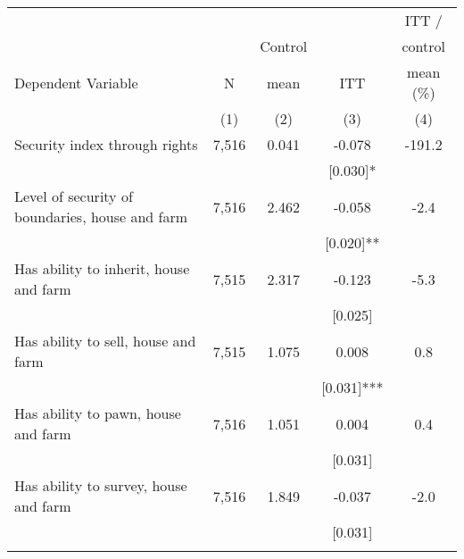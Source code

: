 \begin{tabular}{lcccc}
\hline \noalign{\smallskip} &  &  &  & ITT /\\
 &  & Control &  & control\\
Dependent Variable & N & mean & ITT & mean (\%)\\
 & (1) & (2) & (3) & (4)\\
\noalign{\smallskip}\hline \noalign{\smallskip}Security index through rights & 7,516 & 0.041 & -0.078 & -191.2\\
 &  &  & [0.030]* & \\
\quad Level of security of boundaries, house and farm & 7,516 & 2.462 & -0.058 & -2.4\\
 &  &  & [0.020]** & \\
\quad Has ability to inherit, house and farm & 7,515 & 2.317 & -0.123 & -5.3\\
 &  &  & [0.025] & \\
\quad Has ability to sell, house and farm & 7,515 & 1.075 & 0.008 & 0.8\\
 &  &  & [0.031]*** & \\
\quad Has ability to pawn, house and farm & 7,516 & 1.051 & 0.004 & 0.4\\
 &  &  & [0.031] & \\
\quad Has ability to survey, house and farm & 7,516 & 1.849 & -0.037 & -2.0\\
 &  &  & [0.031] & \\
\noalign{\smallskip}\hline\end{tabular}
